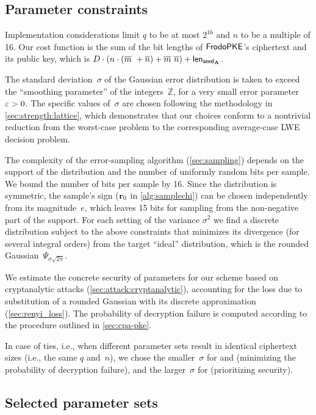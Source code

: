 \subsection{Parameter constraints}\label{sec:constraints}

Implementation considerations limit $q$ to be at most $2^{16}$ and $n$
to be a multiple of 16. Our cost function is the sum of the bit lengths of
$\textsf{\upshape\mdseries FrodoPKE}$'s ciphertext and its public key, which is $D\cdot (n\cdot (\overline{m}\ + \overline{n})+\overline{m}\ \overline{n})+{\mathsf{len}_{{\mathsf{seed}_{\mathbf{A}}}}}$.

The standard deviation~$\sigma$ of the Gaussian error distribution is
taken to exceed the ``smoothing parameter'' of the
integers~$\mathbb{Z}$, for a very small error parameter $\varepsilon >
0$. The specific values of~$\sigma$ are chosen following the
methodology in \autoref{sec:strength:lattice}, which demonstrates that
our choices conform to a nontrivial reduction from the worst-case
\BDDwDGS problem to the corresponding average-case LWE decision
problem.

The complexity of the error-sampling algorithm
(\autoref{sec:sampling}) depends on the support of the distribution
and the number of uniformly random bits per sample. We bound the
number of bits per sample by 16. Since the distribution is symmetric,
the sample's sign ($\mathbf{r}_0$ in \autoref{alg:samplechi}) can be chosen
independently from its magnitude~$e$, which leaves 15 bits for
sampling from the non-negative part of the support. For each setting
of the variance $\sigma^2$ we find a discrete distribution subject to
the above constraints that minimizes its \renyi divergence (for
several integral orders) from the target ``ideal'' distribution, which
is the rounded Gaussian~$\Psi_{\sigma \sqrt{2\pi}}$.

We estimate the concrete security of parameters for our scheme based
on cryptanalytic attacks (\autoref{sec:attack:cryptanalytic}),
accounting for the loss due to substitution of a rounded Gaussian with
its discrete approximation (\autoref{sec:renyi_loss}).  The
probability of decryption failure is computed according to the
procedure outlined in \autoref{sec:cpa-pke}.

In case of ties, i.e., when different parameter sets result in
identical ciphertext sizes (i.e., the same $q$ and~$n$), we chose the
smaller~$\sigma$ for \FrodoKEMLOne and \FrodoKEMLFive (minimizing the probability of
decryption failure), and the larger~$\sigma$ for \FrodoKEMLThree
(prioritizing security).

\subsection{Selected parameter sets}\label{sec:params:sets}

